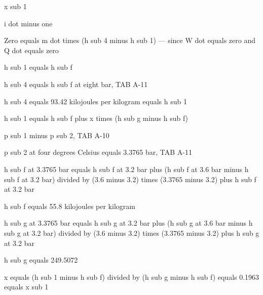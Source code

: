 x sub 1

i dot minus one

Zero equals m dot times (h sub 4 minus h sub 1) — since W dot equals zero and Q dot equals zero

h sub 1 equals h sub f

h sub 4 equals h sub f at eight bar, TAB A-11

h sub 4 equals 93.42 kilojoules per kilogram equals h sub 1

h sub 1 equals h sub f plus x times (h sub g minus h sub f)

p sub 1 minus p sub 2, TAB A-10

p sub 2 at four degrees Celsius equals 3.3765 bar, TAB A-11

h sub f at 3.3765 bar equals h sub f at 3.2 bar plus (h sub f at 3.6 bar minus h sub f at 3.2 bar) divided by (3.6 minus 3.2) times (3.3765 minus 3.2) plus h sub f at 3.2 bar

h sub f equals 55.8 kilojoules per kilogram

h sub g at 3.3765 bar equals h sub g at 3.2 bar plus (h sub g at 3.6 bar minus h sub g at 3.2 bar) divided by (3.6 minus 3.2) times (3.3765 minus 3.2) plus h sub g at 3.2 bar

h sub g equals 249.5072

x equals (h sub 1 minus h sub f) divided by (h sub g minus h sub f) equals 0.1963 equals x sub 1